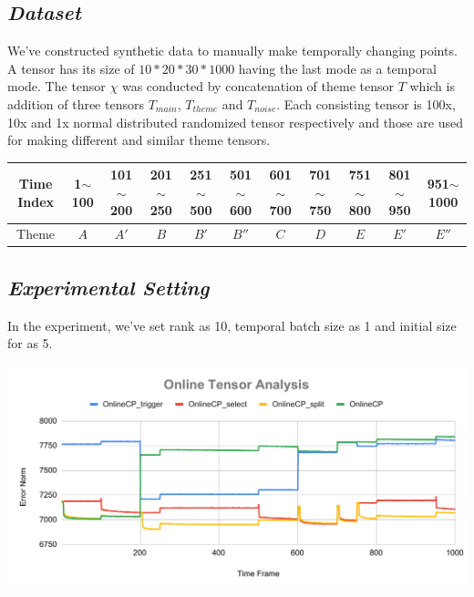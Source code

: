 

\subsection{\em Dataset}
We've constructed synthetic data to manually make temporally changing points. A tensor has its size of $10*20*30*1000$ having the last mode as a temporal mode. The tensor $\chi$ was conducted by concatenation of theme tensor $T$ which is addition of three tensors $T_{main}$, $T_{theme}$ and $T_{noise}$. Each consisting tensor is 100x, 10x and 1x normal distributed randomized tensor respectively and those are used for making different and similar theme tensors.

\begin{table}[htb]
\small
\begin{tabular}{ c | cccccccccc }
 \hline
 Time Index & 1$\sim$100 & 101$\sim$200 & 201$\sim$250 & 251$\sim$500 & 501$\sim$600 & 601$\sim$700 & 701$\sim$750 & 751$\sim$800 & 801$\sim$950 & 951$\sim$1000 \\
 \hline
 Theme & $A$ & $A'$ & $B$ & $B'$ & $B''$ & $C$ & $D$ & $E$ & $E'$ & $E''$ \\
 \hline
\end{tabular}
\end{table}

\subsection{\em Experimental Setting}
In the experiment, we've set rank as 10, temporal batch size as 1 and initial size for \ocp as 5.
 
\begin{center}
	\includegraphics[width=1\textwidth]{FIG/Comparison-analysis.pdf}
\end{center}
